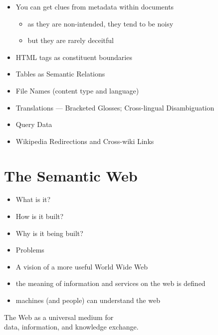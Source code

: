 \documentclass[a4paper,landscape,headrule,footrule,xetex]{foils}
\begin{document}
\begin{itemize}
\item You can get clues from metadata within documents
  \begin{itemize}
  \item as they are non-intended, they tend to be noisy
  \item but they are rarely deceitful
  \end{itemize}
\item HTML tags as constituent boundaries
\item Tables as Semantic Relations
\item File Names (content type and language)
\item Translations ---  Bracketed Glosses;  Cross-lingual Disambiguation
\item Query Data
\item Wikipedia Redirections and Cross-wiki Links
\end{itemize}

\section{The Semantic Web}



\begin{itemize}
\item What is it?
\item How is it built?
\item Why is it being built?
\item Problems
\end{itemize}


\begin{itemize}
\item A vision of a more useful World Wide Web
\item the meaning of information and services on the web is defined
\item machines (and people) can understand the web
\end{itemize}

\begin{center}
  \large The Web as a universal medium for \\ data, information, and knowledge exchange.
\end{center}

%

\end{document}
